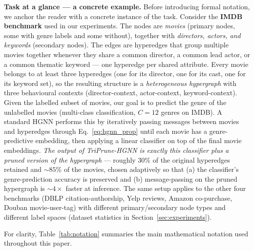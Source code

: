 \documentclass[10pt]{article}
\theoremstyle{plain}
\theoremstyle{definition}
\begin{document}
\textbf{Task at a glance --- a concrete example.} Before introducing formal notation, we anchor the reader with a concrete instance of the task. Consider the \textbf{IMDB benchmark} used in our experiments. The nodes are \emph{movies} (primary nodes, some with genre labels and some without), together with \emph{directors, actors, and keywords} (secondary nodes). The edges are hyperedges that group multiple movies together whenever they share a common director, a common lead actor, or a common thematic keyword --- one hyperedge per shared attribute. Every movie belongs to at least three hyperedges (one for its director, one for its cast, one for its keyword set), so the resulting structure is a \emph{heterogeneous hypergraph} with three behavioural contexts (director-context, actor-context, keyword-context). Given the labelled subset of movies, our goal is to predict the genre of the unlabelled movies (multi-class classification, $C\!=\!12$ genres on IMDB). A standard HGNN performs this by iteratively passing messages between movies and hyperedges through Eq.~\eqref{eq:hgnn_prop} until each movie has a genre-predictive embedding, then applying a linear classifier on top of the final movie embeddings. \emph{The output of TriPrune-HGNN is exactly this classifier plus a pruned version of the hypergraph} --- roughly $30\%$ of the original hyperedges retained and $\sim\!85\%$ of the movies, chosen adaptively so that (a) the classifier's genre-prediction accuracy is preserved and (b) message-passing on the pruned hypergraph is $\sim\!4\times$ faster at inference. The same setup applies to the other four benchmarks (DBLP citation-authorship, Yelp reviews, Amazon co-purchase, Douban movie-user-tag) with different primary/secondary node types and different label spaces (dataset statistics in Section~\ref{sec:experiments}).

For clarity, Table~\ref{tab:notation} summaries the main  mathematical notation used throughout this paper.
\end{document}
